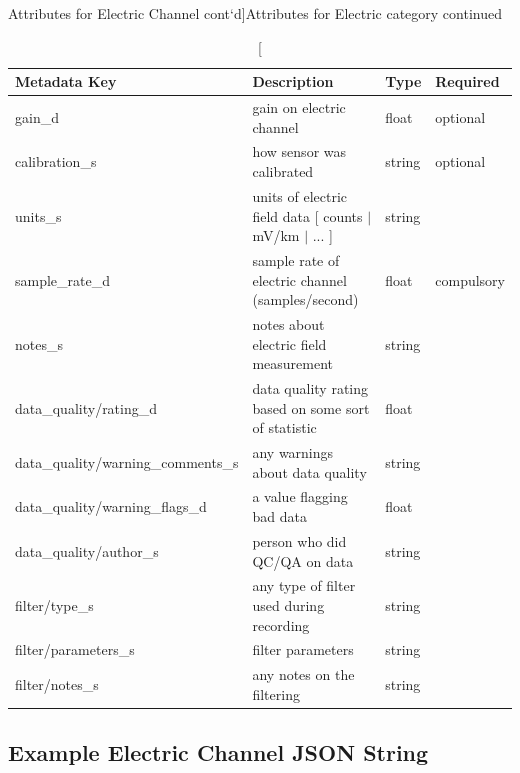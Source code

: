 \documentclass{article}
\begin{document}
\newpage
\begin{table}[htb!]
	\caption[Attributes for Electric Channel cont`d]{Attributes for Electric category continued}
	\begin{tabular}{|l|p{3in}|l|l|}
		\hline
		\textbf{Metadata Key} & \textbf{Description} & \textbf{Type} & \textbf{Required} \\ \hline
		gain\_d & gain on electric channel & float & optional \\ \hline
		calibration\_s & how sensor was calibrated  & string & optional \\ \hline
		units\_s & units of electric field data [ counts $|$ mV/km $|$ ... ] & string &  \\ \hline
		sample\_rate\_d & sample rate of electric channel (samples/second) & float & compulsory \\ \hline
		notes\_s & notes about electric field measurement & string &  \\ \hline
		data\_quality/rating\_d & data quality rating based on some sort of statistic & float &  \\ \hline
		data\_quality/warning\_comments\_s & any warnings about data quality & string &  \\ \hline
		data\_quality/warning\_flags\_d & a value flagging bad data  & float &  \\ \hline
		data\_quality/author\_s & person who did QC/QA on data & string &  \\ \hline
		filter/type\_s & any type of filter used during recording & string &  \\ \hline
		filter/parameters\_s & filter parameters & string &  \\ \hline
		filter/notes\_s & any notes on the filtering & string &  \\ \hline
		\end{tabular}
		\label{tab:electric02}
\end{table}	

\newpage
\subsection{Example Electric Channel JSON String}
\end{document}

